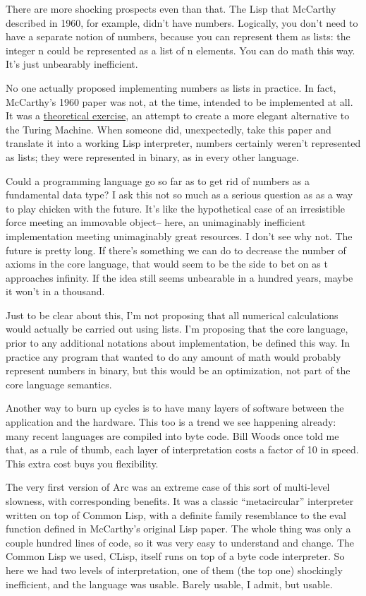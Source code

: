 \documentclass[12pt]{book}
\begin{document}
There are more shocking prospects even than that. The Lisp that McCarthy
described in 1960, for example, didn't have numbers. Logically, you
don't need to have a separate notion of numbers, because you can
represent them as lists: the integer n could be represented as a list of
n elements. You can do math this way. It's just unbearably inefficient.

No one actually proposed implementing numbers as lists in practice. In
fact, McCarthy's 1960 paper was not, at the time, intended to be
implemented at all. It was a \href{rootsoflisp.html}{theoretical
exercise}, an attempt to create a more elegant alternative to the Turing
Machine. When someone did, unexpectedly, take this paper and translate
it into a working Lisp interpreter, numbers certainly weren't
represented as lists; they were represented in binary, as in every other
language.

Could a programming language go so far as to get rid of numbers as a
fundamental data type? I ask this not so much as a serious question as
as a way to play chicken with the future. It's like the hypothetical
case of an irresistible force meeting an immovable object-- here, an
unimaginably inefficient implementation meeting unimaginably great
resources. I don't see why not. The future is pretty long. If there's
something we can do to decrease the number of axioms in the core
language, that would seem to be the side to bet on as t approaches
infinity. If the idea still seems unbearable in a hundred years, maybe
it won't in a thousand.

Just to be clear about this, I'm not proposing that all numerical
calculations would actually be carried out using lists. I'm proposing
that the core language, prior to any additional notations about
implementation, be defined this way. In practice any program that wanted
to do any amount of math would probably represent numbers in binary, but
this would be an optimization, not part of the core language semantics.

Another way to burn up cycles is to have many layers of software between
the application and the hardware. This too is a trend we see happening
already: many recent languages are compiled into byte code. Bill Woods
once told me that, as a rule of thumb, each layer of interpretation
costs a factor of 10 in speed. This extra cost buys you flexibility.

The very first version of Arc was an extreme case of this sort of
multi-level slowness, with corresponding benefits. It was a classic
``metacircular'' interpreter written on top of Common Lisp, with a
definite family resemblance to the eval function defined in McCarthy's
original Lisp paper. The whole thing was only a couple hundred lines of
code, so it was very easy to understand and change. The Common Lisp we
used, CLisp, itself runs on top of a byte code interpreter. So here we
had two levels of interpretation, one of them (the top one) shockingly
inefficient, and the language was usable. Barely usable, I admit, but
usable.
\end{document}
